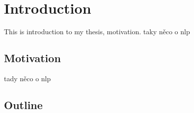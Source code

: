 \chapter{Introduction}
This is introduction to my thesis, motivation. taky něco o nlp
\section{Motivation}
tady něco o nlp
\section{Outline}
